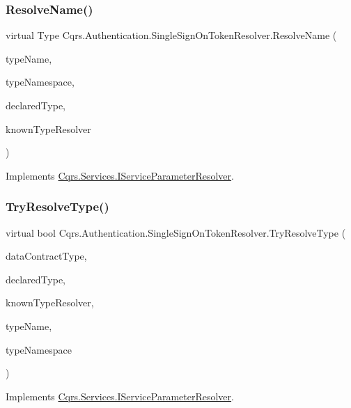 \subsubsection{\texorpdfstring{Resolve\+Name()}{ResolveName()}}
{\footnotesize\ttfamily virtual Type Cqrs.\+Authentication.\+Single\+Sign\+On\+Token\+Resolver.\+Resolve\+Name (\begin{DoxyParamCaption}\item[{string}]{type\+Name,  }\item[{string}]{type\+Namespace,  }\item[{Type}]{declared\+Type,  }\item[{Data\+Contract\+Resolver}]{known\+Type\+Resolver }\end{DoxyParamCaption})\hspace{0.3cm}{\ttfamily [virtual]}}



Implements \hyperlink{interfaceCqrs_1_1Services_1_1IServiceParameterResolver_a37c4b53616192e4e2f15ab4661ab99ae_a37c4b53616192e4e2f15ab4661ab99ae}{Cqrs.\+Services.\+I\+Service\+Parameter\+Resolver}.

\mbox{\label{classCqrs_1_1Authentication_1_1SingleSignOnTokenResolver_af474315b8fc66d17d64460fab8c63dd1_af474315b8fc66d17d64460fab8c63dd1}} 
\subsubsection{\texorpdfstring{Try\+Resolve\+Type()}{TryResolveType()}}
{\footnotesize\ttfamily virtual bool Cqrs.\+Authentication.\+Single\+Sign\+On\+Token\+Resolver.\+Try\+Resolve\+Type (\begin{DoxyParamCaption}\item[{Type}]{data\+Contract\+Type,  }\item[{Type}]{declared\+Type,  }\item[{Data\+Contract\+Resolver}]{known\+Type\+Resolver,  }\item[{out Xml\+Dictionary\+String}]{type\+Name,  }\item[{out Xml\+Dictionary\+String}]{type\+Namespace }\end{DoxyParamCaption})\hspace{0.3cm}{\ttfamily [virtual]}}



Implements \hyperlink{interfaceCqrs_1_1Services_1_1IServiceParameterResolver_a31c82a00b192b877faff6df99e1b689b_a31c82a00b192b877faff6df99e1b689b}{Cqrs.\+Services.\+I\+Service\+Parameter\+Resolver}.

